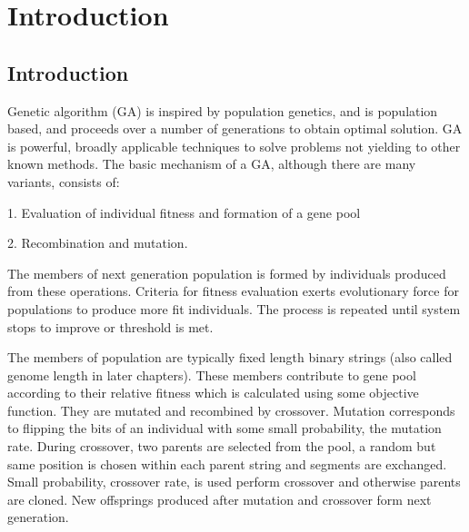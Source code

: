 \chapter{Introduction} \label{ch:introduction}

\section{Introduction}
Genetic algorithm (GA) is inspired by population genetics, and is population based, and 
proceeds over a number of generations to obtain optimal solution. GA is powerful, broadly applicable 
techniques to solve problems not yielding to other known methods. The basic mechanism of a GA, 
although there are many variants, consists of:

1. Evaluation of individual fitness and formation of a gene pool

2. Recombination and mutation.

The members of next generation population is formed by individuals produced from these operations. 
Criteria for fitness evaluation exerts evolutionary force for populations to produce more fit individuals. 
The process is repeated until system stops to improve or threshold is met.

The members of population are typically fixed length binary strings (also called genome length in later chapters). 
These members contribute to gene pool according to their relative fitness which is calculated using some objective function. 
They are mutated and recombined by crossover. Mutation corresponds to flipping the bits of an individual with some small probability, 
the mutation rate. During crossover, two parents are selected from the pool, a random but same position is chosen within 
each parent string and segments are exchanged. Small probability, crossover rate, is used perform crossover and otherwise 
parents are cloned. New offsprings produced after mutation and crossover form next generation.

